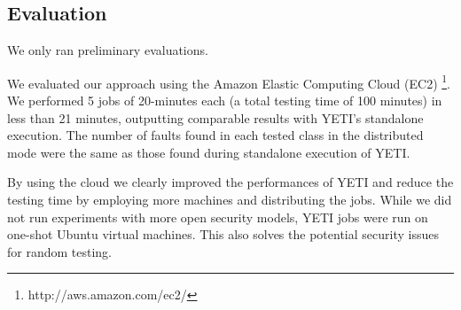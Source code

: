 \subsection{Evaluation}

We only ran preliminary evaluations.

We evaluated our approach using the Amazon Elastic Computing Cloud (EC2) \footnote{http://aws.amazon.com/ec2/}.
We performed 5 jobs of 20-minutes each (a total testing time of 100 minutes) in less 
than 21 minutes, outputting comparable results with YETI's standalone execution. 
The number of faults found in each tested class in the distributed mode were the same as those found during standalone execution of YETI. 

By using the cloud we clearly improved the performances of YETI and reduce the testing time by 
employing more machines and distributing the jobs.
While we did not run experiments with more open security models, 
YETI jobs were run on one-shot Ubuntu virtual machines. This also solves
the potential security issues for random testing.
